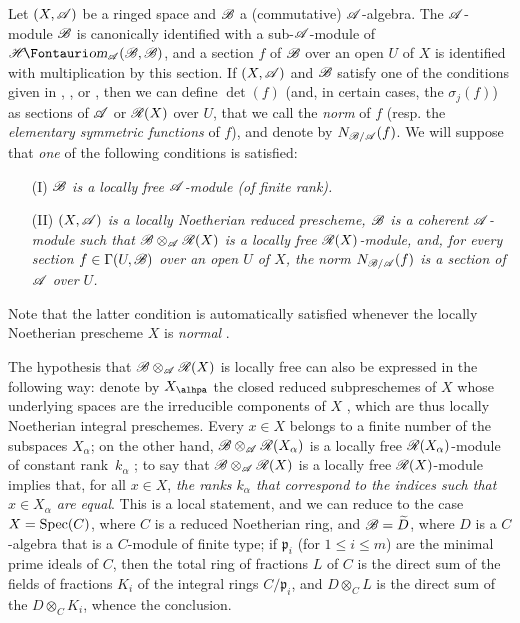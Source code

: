 \begin{env}[6.5.1]
\label{II.6.5.1}
Let $(X,\mathscr{A})$ be a ringed space and $\mathscr{B}$ a (commutative) $\mathscr{A}$-algebra.
The $\mathscr{A}$-module $\mathscr{B}$ is canonically identified with a sub-$\mathscr{A}$-module of $\shHom_{\sh{A}}(\sh{B},\sh{B})$, and a section $f$ of $\mathscr{B}$ over an open $U$ of $X$ is identified with multiplication by this section.
If $(X,\mathscr{A})$ and $\mathscr{B}$ satisfy one of the conditions given in , , or , then we can define $\det(f)$ (and, in certain cases, the $\sigma_j(f)$) as sections of $\mathscr{A}$ or $\mathscr{R}(X)$ over $U$, that we call the \emph{norm} of $f$ (resp. the \emph{elementary symmetric functions} of $f$), and denote by $N_{\mathscr{B}/\mathscr{A}}(f)$.
We will suppose that \emph{one} of the following conditions is satisfied:
\begin{enumerate}
  \item[(I)] \emph{$\mathscr{B}$ is a locally free $\mathscr{A}$-module (of finite rank).}
  \item[(II)] \emph{$(X,\mathscr{A})$ is a locally Noetherian reduced prescheme, $\mathscr{B}$ is a coherent $\mathscr{A}$-module such that $\mathscr{B}\otimes_{\mathscr{A}}\mathscr{R}(X)$ is a locally free $\mathscr{R}(X)$-module, and, for every section $f\in\Gamma(U,\mathscr{B})$ over an open $U$ of $X$, the norm $N_{\mathscr{B}/\mathscr{A}}(f)$ is a section of $\mathscr{A}$ over $U$.}
\end{enumerate}

Note that the latter condition is automatically satisfied whenever the locally Noetherian prescheme $X$ is \emph{normal} .

The hypothesis that $\mathscr{B}\otimes_{\mathscr{A}}\mathscr{R}(X)$ is locally free can also be expressed in the following way: denote by $X_\alhpa$ the closed reduced subpreschemes of $X$ whose underlying spaces are the irreducible components of $X$ , which are thus locally Noetherian integral preschemes.
Every $x\in X$ belongs to a finite number of the subspaces $X_\alpha$;
on the other hand, $\mathscr{B}\otimes_{\mathscr{A}}\mathscr{R}(X_\alpha)$ is a locally free $\mathscr{R}(X_\alpha)$-module of constant rank~$k_\alpha$ ;
to say that $\mathscr{B}\otimes_{\mathscr{A}}\mathscr{R}(X)$ is a locally free $\mathscr{R}(X)$-module implies that, for all $x\in X$, \emph{the ranks $k_\alpha$ that correspond to the indices such that $x\in X_\alpha$ are equal}.
This is a local statement, and we can reduce to the case $X=\operatorname{Spec}(C)$, where $C$ is a reduced Noetherian ring, and $\mathscr{B}=\widetilde{D}$, where $D$ is a $C$-algebra that is a $C$-module of finite type;
if $\mathfrak{p}_i$ (for $1\leq i\leq m$) are the minimal prime ideals of $C$, then the total ring of fractions $L$ of $C$ is the direct sum of the fields of fractions $K_i$ of the integral rings $C/\mathfrak{p}_i$, and $D\otimes_C L$ is the direct sum of the $D\otimes_C K_i$, whence the conclusion.


\end{env}
